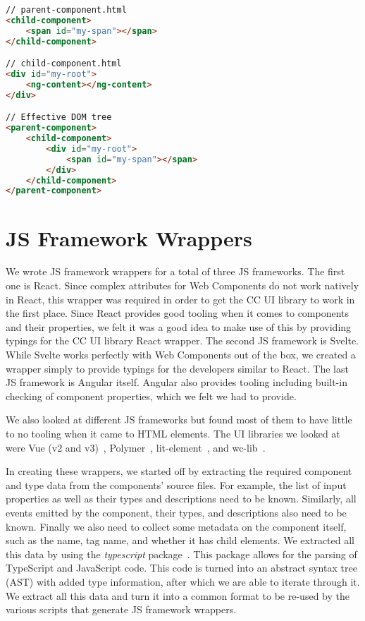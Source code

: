 \begin{lstlisting}[language={HTML},caption={HTML source code and its Angular Elements equivalent},label={lst:case-study:ng-content}]
// parent-component.html
<child-component>
	<span id="my-span"></span>
</child-component>

// child-component.html
<div id="my-root">
	<ng-content></ng-content>
</div>

// Effective DOM tree
<parent-component>
	<child-component>
		<div id="my-root">
			<span id="my-span"></span>
		</div>
	</child-component>
</parent-component>
	\end{lstlisting}

\section{JS Framework Wrappers}
We wrote JS framework wrappers for a total of three JS frameworks. The first one is React. Since complex attributes for Web Components do not work natively in React, this wrapper was required in order to get the CC UI library to work in the first place. Since React provides good tooling when it comes to components and their properties, we felt it was a good idea to make use of this by providing typings for the CC UI library React wrapper. The second JS framework is Svelte. While Svelte works perfectly with Web Components out of the box, we created a wrapper simply to provide typings for the developers similar to React. The last JS framework is Angular itself. Angular also provides tooling including built-in checking of component properties, which we felt we had to provide.

We also looked at different JS frameworks but found most of them to have little to no tooling when it came to HTML elements. The UI libraries we looked at were Vue (v2 and v3)~, Polymer~, lit-element~, and wc-lib~.

In creating these wrappers, we started off by extracting the required component and type data from the components' source files. For example, the list of input properties as well as their types and descriptions need to be known. Similarly, all events emitted by the component, their types, and descriptions also need to be known. Finally we also need to collect some metadata on the component itself, such as the name, tag name, and whether it has child elements. We extracted all this data by using the \emph{typescript} package~. This package allows for the parsing of TypeScript and JavaScript code. This code is turned into an abstract syntax tree (AST) with added type information, after which we are able to iterate through it. We extract all this data and turn it into a common format to be re-used by the various scripts that generate JS framework wrappers.

